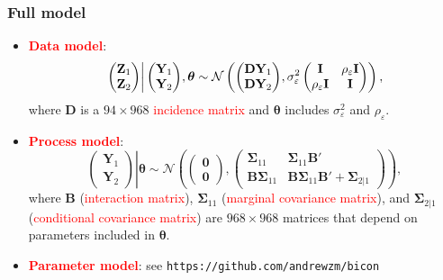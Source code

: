 \documentclass{beamer}
\newcommand{\Bmat} {\textbf{B}}
\newcommand{\Dmat} {\textbf{D}}
\newcommand{\Imat} {\textbf{I}}
\newcommand{\Yvec}{\mathbf{Y}}
\newcommand{\Zvec}{\mathbf{Z}}
\newcommand{\thetab}{\boldsymbol{\theta}}
\newcommand{\bzero}{\boldsymbol{0}}
\newcommand{\bSigma}{\bm{\Sigma}}
\begin{document}

\begin{frame}
\frametitle{Full model}

\begin{itemize}
\item \textcolor{red}{\textbf{Data model}}:
\begin{align*}
\left.\begin{pmatrix} \Zvec_1 \\ \Zvec_2 \end{pmatrix}
\right|
\begin{pmatrix} \Yvec_1 \\ \Yvec_2 \end{pmatrix} \hspace{-0.02in} ,\thetab
\sim
\mathcal{N}\left(
\begin{pmatrix} \Dmat\Yvec_1 \\ \Dmat\Yvec_2 \end{pmatrix}  \hspace{-0.02in}, \sigma^2_\varepsilon\begin{pmatrix} \Imat & \rho_\varepsilon\Imat \\ \rho_\varepsilon\Imat & \Imat \end{pmatrix}
\right),
\end{align*}
where $\Dmat$ is a $94\times 968$ \textcolor{red}{incidence matrix} and $\thetab$ includes $\sigma^2_\varepsilon$ and $\rho_\varepsilon$.
\item \textcolor{red}{\textbf{Process model}}:
\begin{equation*}
\left.\begin{pmatrix} \Yvec_1 \\ \Yvec_2 \end{pmatrix}\right| \thetab \sim \mathcal{N}
\left(
\begin{pmatrix} \bzero \\ \bzero \end{pmatrix},
\begin{pmatrix}
\bSigma_{11} & \bSigma_{11}\Bmat' \\
\Bmat \bSigma_{11} & \Bmat \bSigma_{11}\Bmat' + \bSigma_{2|1}
\end{pmatrix}
\right),
\end{equation*}
\noindent where $\mathbf{B}$ (\textcolor{red}{interaction matrix}), $\bSigma_{11}$ (\textcolor{red}{marginal covariance matrix}), and $\bSigma_{2|1}$ (\textcolor{red}{conditional covariance matrix}) are $968\times 968$ matrices that depend on parameters included in $\thetab$.
\item \textcolor{red}{\textbf{Parameter model}}: see \texttt{https://github.com/andrewzm/bicon}
\end{itemize}
\end{frame}
\end{document}
